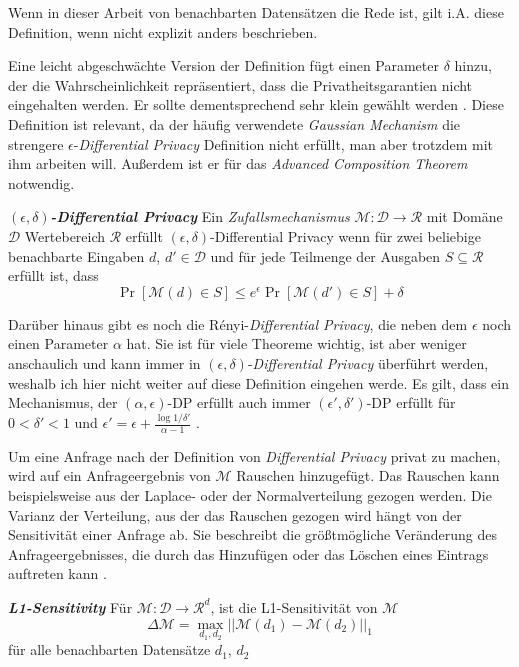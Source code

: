 Wenn in dieser Arbeit von benachbarten Datensätzen die Rede ist, gilt i.A. diese Definition, wenn nicht explizit anders beschrieben.

Eine leicht abgeschwächte Version der Definition fügt einen Parameter $\delta$ hinzu, der die Wahrscheinlichkeit repräsentiert, dass die Privatheitsgarantien nicht eingehalten werden. Er sollte dementsprechend sehr klein gewählt werden \cite{dwork:2014}. Diese Definition ist relevant, da der häufig verwendete \textit{Gaussian Mechanism} die strengere $\epsilon$-\textit{Differential Privacy} Definition nicht erfüllt, man aber trotzdem mit ihm arbeiten will. Außerdem ist er für das \textit{Advanced Composition Theorem} notwendig.

\begin{definition}\label{def:eps-delta-differential-privacy}
	\emph{\textbf{$(\epsilon, \delta)$-Differential Privacy}} Ein \textit{Zufallsmechanismus} $\mathcal{M}: \mathcal{D} \rightarrow \mathcal{R}$ mit Domäne $\mathcal{D}$ Wertebereich $\mathcal{R}$ erfüllt $(\epsilon, \delta)$-Differential Privacy wenn für zwei beliebige benachbarte Eingaben $d$, $d' \in \mathcal{D}$ und für jede Teilmenge der Ausgaben $S \subseteq \mathcal{R}$ erfüllt ist, dass $$\Pr[\mathcal{M}(d) \in S] \leq e^{\epsilon} \Pr[\mathcal{M}(d') \in S] + \delta$$
\end{definition}

Darüber hinaus gibt es noch die Rényi-\textit{Differential Privacy}, die neben dem $\epsilon$ noch einen Parameter $\alpha$ hat. Sie ist für viele Theoreme wichtig, ist aber weniger anschaulich und kann immer in $(\epsilon, \delta)$-\textit{Differential Privacy} überführt werden, weshalb ich hier nicht weiter auf diese Definition eingehen werde. Es gilt, dass ein Mechanismus, der $(\alpha, \epsilon)$-DP erfüllt auch immer $(\epsilon', \delta')$-DP erfüllt für $0 < \delta' < 1$ und $\epsilon' = \epsilon + \frac{\log 1 / \delta'}{\alpha - 1}$ \cite{mironov:2017}.

Um eine Anfrage nach der Definition von \textit{Differential Privacy} privat zu machen, wird auf ein Anfrageergebnis von $\mathcal{M}$ Rauschen hinzugefügt. Das Rauschen kann beispielsweise aus der Laplace- oder der Normalverteilung gezogen werden. Die Varianz der Verteilung, aus der das Rauschen gezogen wird hängt von der Sensitivität einer Anfrage ab. Sie beschreibt die größtmögliche Veränderung des Anfrageergebnisses, die durch das Hinzufügen oder das Löschen eines Eintrags auftreten kann \cite{dwork:2006}.

\begin{definition}\label{def:l1-sensitivity}
	\emph{\textbf{L1-Sensitivity}} Für $\mathcal{M}: \mathcal{D} \rightarrow \mathcal{R}^{d}$, ist die L1-Sensitivität von $\mathcal{M}$
	$$
	\Delta \mathcal{M} = \max_{d_1, d_2}{||\mathcal{M}(d_1) - \mathcal{M}(d_2)||}_1
	$$
	für alle benachbarten Datensätze $d_1$, $d_2$
\end{definition}

